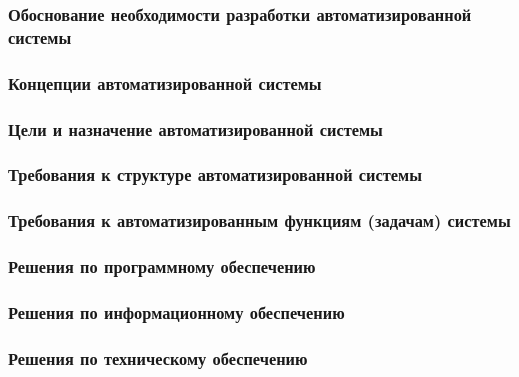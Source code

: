 \begin{frame}
    \frametitle{Обоснование необходимости разработки автоматизированной системы}
\end{frame}

\begin{frame}
    \frametitle{Концепции автоматизированной системы}
\end{frame}

\begin{frame}
    \frametitle{Цели и назначение автоматизированной системы}

\end{frame}

\begin{frame}
    \frametitle{Требования к структуре автоматизированной системы}
\end{frame}

\begin{frame}
    \frametitle{Требования к автоматизированным функциям (задачам) системы}
\end{frame}

\begin{frame}
    \frametitle{Решения по программному обеспечению}
\end{frame}

\begin{frame}
    \frametitle{Решения по информационному обеспечению}
\end{frame}

\begin{frame}
    \frametitle{Решения по техническому обеспечению}
\end{frame}

